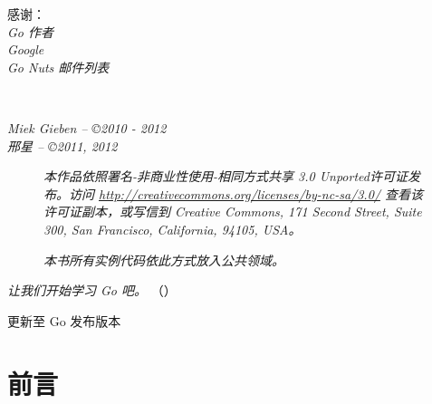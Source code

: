 \documentclass[twoside,openleft]{blocksbook}
\begin{document}
\begin{cjkc}
\begin{minipage}{0.4\textwidth}
\begin{flushright}
感谢：\\
\emph{Go 作者}\\
\emph{Google}\\
\emph{Go Nuts 邮件列表}\\
\vfill
\end{flushright}
\end{minipage}
\vfill
\begin{center}
    \hspace*{1cm}\\[2.5ex]
    \hspace*{1cm}{\tiny\CcNote{\CcLongnameByNcSa}}
\end{center}
\begin{center}
\hspace*{1cm}\emph{Miek Gieben -- \copyright 2010 - 2012}\\
\hspace*{1cm}\emph{邢星 -- \copyright 2011, 2012}
\end{center}
\vspace{-3em}

\newpage

\thispagestyle{empty}
\begin{figure}[H]
\begin{center}
\emph{
本作品依照署名-非商业性使用-相同方式共享 3.0 Unported许可证发布。访问 \url{http://creativecommons.org/licenses/by-nc-sa/3.0/} 查看该许可证副本，或写信到 Creative Commons, 171 Second Street, Suite 300, San Francisco, California, 94105, USA。}
\vspace{2em}

\emph{本书所有实例代码依此方式放入公共领域。}
\end{center}
\end{figure}
\begin{center}
\vfill
\emph{让我们开始学习 Go 吧。}
（\emph{\version}）

\tiny{更新至 Go 发布版本 }
\vspace{.2\stockheight}
\end{center}

\clearpage

\tableofcontents*
\listoffigures*
\listofcode* 
\listofex* 
\clearpage

\chapter*{前言}
\label{chap:preface}



\end{cjkc}
\end{document}
